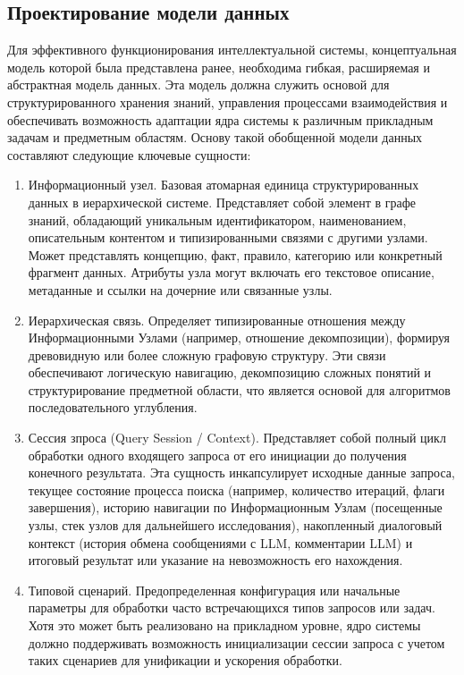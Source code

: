 \subsection{Проектирование модели данных}

Для эффективного функционирования интеллектуальной системы, концептуальная модель которой была представлена ранее, необходима гибкая, расширяемая и абстрактная модель данных. Эта модель должна служить основой для структурированного хранения знаний, управления процессами взаимодействия и обеспечивать возможность адаптации ядра системы к различным прикладным задачам и предметным областям. Основу такой обобщенной модели данных составляют следующие ключевые сущности:

\begin{enumerate}[label=\arabic*.]
    \item Информационный узел. Базовая атомарная единица структурированных данных в иерархической системе. Представляет собой элемент в графе знаний, обладающий уникальным идентификатором, наименованием, описательным контентом и типизированными связями с другими узлами. Может представлять концепцию, факт, правило, категорию или конкретный фрагмент данных. Атрибуты узла могут включать его текстовое описание, метаданные и ссылки на дочерние или связанные узлы.

    \item Иерархическая связь. Определяет типизированные отношения между Информационными Узлами (например, отношение декомпозиции), формируя древовидную или более сложную графовую структуру. Эти связи обеспечивают логическую навигацию, декомпозицию сложных понятий и структурирование предметной области, что является основой для алгоритмов последовательного углубления.

    \item Сессия зпроса (Query Session / Context). Представляет собой полный цикл обработки одного входящего запроса от его инициации до получения конечного результата. Эта сущность инкапсулирует исходные данные запроса, текущее состояние процесса поиска (например, количество итераций, флаги завершения), историю навигации по Информационным Узлам (посещенные узлы, стек узлов для дальнейшего исследования), накопленный диалоговый контекст (история обмена сообщениями с LLM, комментарии LLM) и итоговый результат или указание на невозможность его нахождения.
    
    \item Типовой сценарий. Предопределенная конфигурация или начальные параметры для обработки часто встречающихся типов запросов или задач. Хотя это может быть реализовано на прикладном уровне, ядро системы должно поддерживать возможность инициализации сессии запроса с учетом таких сценариев для унификации и ускорения обработки.
    

\end{enumerate}
